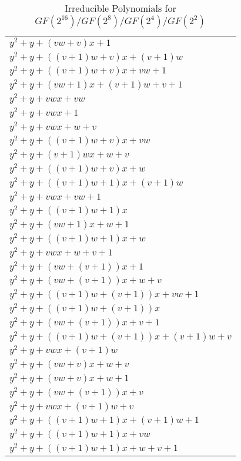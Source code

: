 \begin{center}
\begin{longtable}{|l|}
\caption[Irreducible Polynomials for $GF(2^{16})/GF(2^8)/GF(2^4)/GF(2^2)$]{Irreducible Polynomials for $GF(2^{16})/GF(2^8)/GF(2^4)/GF(2^2)$}\\
\hline
	$y^2 + y + (vw + v)x + 1$ \\
	$y^2 + y + ((v + 1)w + v)x + (v + 1)w$ \\
	$y^2 + y + ((v + 1)w + v)x + vw + 1$ \\
	$y^2 + y + (vw + 1)x + (v + 1)w + v + 1$ \\
	$y^2 + y + vwx + vw$ \\ 
	$y^2 + y + vwx + 1$ \\
	$y^2 + y + vwx + w + v$ \\
	$y^2 + y + ((v + 1)w + v)x + vw$ \\
	$y^2 + y + (v + 1)wx + w + v$ \\
	$y^2 + y + ((v + 1)w + v)x + w$ \\
	$y^2 + y + ((v + 1)w + 1)x + (v + 1)w$ \\
	$y^2 + y + vwx + vw + 1$ \\
	$y^2 + y + ((v + 1)w + 1)x$ \\
	$y^2 + y + (vw + 1)x + w + 1$ \\
	$y^2 + y + ((v + 1)w + 1)x + w$ \\
	$y^2 + y + vwx + w + v + 1$ \\
	$y^2 + y + (vw + (v + 1))x + 1$ \\
	$y^2 + y + (vw + (v + 1))x + w + v$ \\
	$y^2 + y + ((v + 1)w + (v + 1))x + vw + 1$ \\
	$y^2 + y + ((v + 1)w + (v + 1))x$ \\
	$y^2 + y + (vw + (v + 1))x + v + 1$ \\
	$y^2 + y + ((v + 1)w + (v + 1))x + (v + 1)w + v$ \\
	$y^2 + y + vwx + (v + 1)w$ \\
	$y^2 + y + (vw + v)x + w + v$ \\
	$y^2 + y + (vw + v)x + w + 1$ \\
	$y^2 + y + (vw + (v + 1))x + v$ \\
	$y^2 + y + vwx + (v + 1)w + v$ \\
	$y^2 + y + ((v + 1)w + 1)x + (v + 1)w + 1$ \\
	$y^2 + y + ((v + 1)w + 1)x + vw$ \\
	$y^2 + y + ((v + 1)w + 1)x + w + v + 1$ \\

\end{longtable}
\end{center}
